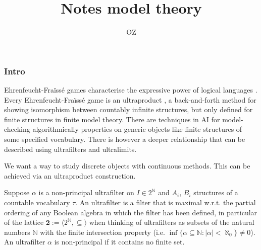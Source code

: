 
%

\title{Notes model theory}
\author{OZ}



\maketitle
%
\subsubsection*{Intro}
Ehrenfeucht-Fra\"iss\'e games characterise the expressive power of logical languages \cite{ams}. Every Ehrenfeucht-Fra\"iss\'e game is an ultraproduct \cite{models}, a back-and-forth method for showing isomorphism between countably infinite structures, but only defined for finite structures in finite model theory. There are techniques in AI for model-checking algorithmically properties on generic objects like finite structures of some specified vocabulary. There is however a deeper relationship that can be described using ultrafilters and ultralimits. 


We want a way to study discrete objects with continuous methods. This can be achieved via an ultraproduct construction. 

Suppose $\alpha$ is a non-principal ultrafilter on $I\in 2^{\mathbb{N}}$ and $A_i$, $B_i$ structures of a countable vocabulary $\tau$. An ultrafilter is a filter that is maximal w.r.t. the partial ordering of any Boolean algebra in which the filter has been defined, in particular of the lattice $\mathbf{2} := \langle 2^{\mathbb{N}}, \subseteq\rangle$ when thinking of ultrafilters as subsets of the natural numbers $\mathbb{N}$ with the finite intersection property (i.e. $\inf\{\alpha\subseteq\mathbb{N}: |\alpha|<\aleph_0\} \neq 0$). An ultrafilter $\alpha$ is non-principal if it contains no finite set. 
 
